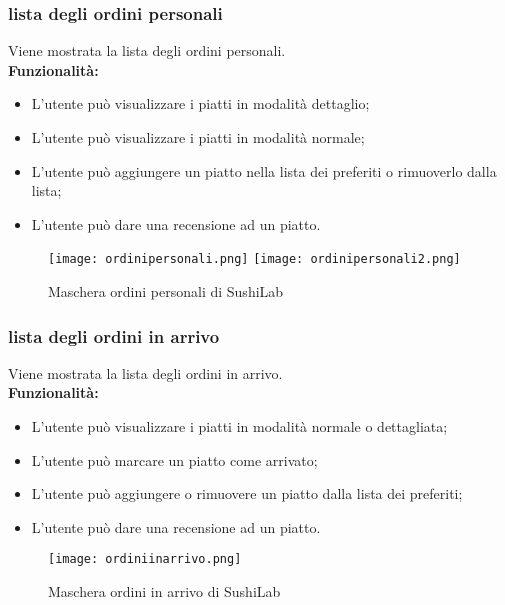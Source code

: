 \subsubsection{lista degli ordini personali}
Viene mostrata la lista degli ordini personali.\\
\textbf{Funzionalità:}
\begin{itemize}
    \item L'utente può visualizzare i piatti in modalità dettaglio;
    \item L'utente può visualizzare i piatti in modalità normale;
    \item L'utente può aggiungere un piatto nella lista dei preferiti o rimuoverlo dalla lista;
    \item L'utente può dare una recensione ad un piatto.
\end{itemize}
\begin{figure}[H]
    \centering
    \texttt{[image: ordinipersonali.png]}
    \texttt{[image: ordinipersonali2.png]}
    \caption{Maschera ordini personali di SushiLab}
\end{figure}
\pagebreak

\subsubsection{lista degli ordini in arrivo}
Viene mostrata la lista degli ordini in arrivo.\\
\textbf{Funzionalità:}
\begin{itemize}
    \item L'utente può visualizzare i piatti in modalità normale o dettagliata;
    \item L'utente può marcare un piatto come arrivato;
    \item L'utente può aggiungere o rimuovere un piatto dalla lista dei preferiti;
    \item L'utente può dare una recensione ad un piatto.
\end{itemize}
\begin{figure}[H]
    \centering
    \texttt{[image: ordiniinarrivo.png]}
    \caption{Maschera ordini in arrivo di SushiLab}
\end{figure}
\pagebreak

